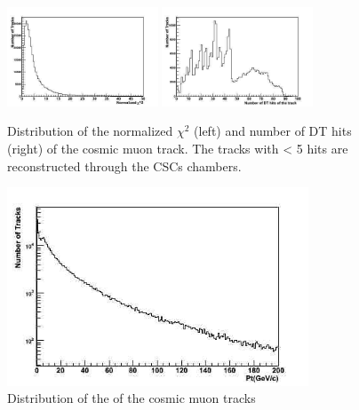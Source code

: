 \begin{figure}[hbtp]

 \begin{minipage}{1.0\textwidth}
  \begin{center}
 
     \includegraphics[width=0.4\textwidth]{chi2_sta}
     \includegraphics[width=0.4\textwidth]{num_hits_sta}
\caption{Distribution of the normalized $\chi^2$ (left) and number of DT hits (right) 
of the cosmic muon track. The tracks with < 5 hits
 are reconstructed through the CSCs chambers. }
      \label{fig:nhitschi2}
  \end{center}
  \end{minipage}

     \begin{minipage}{1.0\textwidth}
     \begin{center}
      \includegraphics[width=0.8\textwidth]{pt_sta}
       \caption{ 
Distribution of the \pt of the cosmic muon tracks 
}
      \label{fig:pttrack}
  \end{center}
  \end{minipage}
     


\end{figure}


